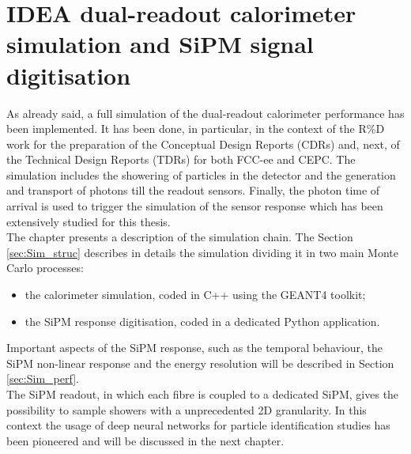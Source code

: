 \chapter[IDEA DR calorimeter simulation]{IDEA dual-readout calorimeter simulation and SiPM signal digitisation}
As already said, a full simulation of the dual-readout calorimeter performance has been implemented. It has been done, in particular, in the context of the R\%D work for the preparation of the Conceptual Design Reports (CDRs) and, next, of the Technical Design Reports (TDRs) for both FCC-ee and CEPC. The simulation includes the showering of particles in the detector and the generation and transport of photons till the readout sensors. Finally, the photon time of arrival is used to trigger the simulation of the sensor response which has been extensively studied for this thesis.\\

The chapter presents a description of the simulation chain. The Section \ref{sec:Sim_struc} describes in details the simulation dividing it in two main Monte Carlo processes:
\begin{itemize}
	\item the calorimeter simulation, coded in C++ using the GEANT4 toolkit;
	\item the SiPM response digitisation, coded in a dedicated Python application.
\end{itemize}

Important aspects of the SiPM response, such as the temporal behaviour, the SiPM non-linear response and the energy resolution will be described in Section \ref{sec:Sim_perf}.\\

The SiPM readout, in which each fibre is coupled to a dedicated SiPM, gives the possibility to sample showers with a unprecedented 2D granularity.
In this context the usage of deep neural networks for particle identification studies has been pioneered and will be discussed in the next chapter.



